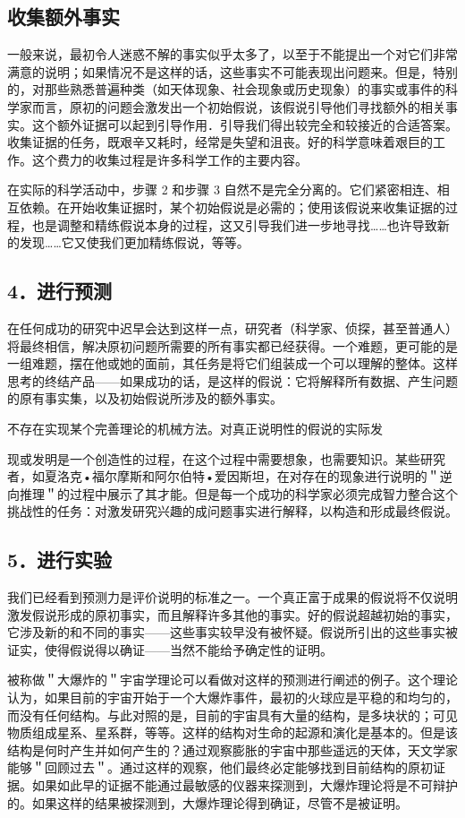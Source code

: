 \subsection{收集额外事实}
一般来说，最初令人迷惑不解的事实似乎太多了，以至于不能提出一个对它们非常满意的说明；如果情况不是这样的话，这些事实不可能表现出问题来。但是，特别的，对那些熟悉普遍种类（如天体现象、社会现象或历史现象）的事实或事件的科学家而言，原初的问题会激发出一个初始假说，该假说引导他们寻找额外的相关事实。这个额外证据可以起到引导作用．引导我们得出较完全和较接近的合适答案。收集证据的任务，既艰辛又耗时，经常是失望和沮丧。好的科学意味着艰巨的工作。这个费力的收集过程是许多科学工作的主要内容。

在实际的科学活动中，步骤 2 和步骤 3 自然不是完全分离的。它们紧密相连、相互依赖。在开始收集证据时，某个初始假说是必需的；使用该假说来收集证据的过程，也是调整和精练假说本身的过程，这又引导我们进一步地寻找……也许导致新的发现……它又使我们更加精练假说，等等。

\subsection{4．进行预测}
在任何成功的研究中迟早会达到这样一点，研究者（科学家、侦探，甚至普通人）将最终相信，解决原初问题所需要的所有事实都已经获得。一个难题，更可能的是一组难题，摆在他或她的面前，其任务是将它们组装成一个可以理解的整体。这样思考的终结产品——如果成功的话，是这样的假说：它将解释所有数据、产生问题的原有事实集，以及初始假说所涉及的额外事实。

不存在实现某个完善理论的机械方法。对真正说明性的假说的实际发

现或发明是一个创造性的过程，在这个过程中需要想象，也需要知识。某些研究者，如夏洛克•福尔摩斯和阿尔伯特•爱因斯坦，在对存在的现象进行说明的＂逆向推理＂的过程中展示了其才能。但是每一个成功的科学家必须完成智力整合这个挑战性的任务：对激发研究兴趣的成问题事实进行解释，以构造和形成最终假说。\cite{peirce1958}

\subsection{5．进行实验}
我们已经看到预测力是评价说明的标准之一。一个真正富于成果的假说将不仅说明激发假说形成的原初事实，而且解释许多其他的事实。好的假说超越初始的事实，它涉及新的和不同的事实——这些事实较早没有被怀疑。假说所引出的这些事实被证实，使得假说得以确证——当然不能给予确定性的证明。

被称做＂大爆炸的＂宇宙学理论可以看做对这样的预测进行阐述的例子。这个理论认为，如果目前的宇宙开始于一个大爆炸事件，最初的火球应是平稳的和均匀的，而没有任何结构。与此对照的是，目前的宇宙具有大量的结构，是多块状的；可见物质组成星系、星系群，等等。这样的结构对生命的起源和演化是基本的。但是该结构是何时产生并如何产生的？通过观察膨胀的宇宙中那些遥远的天体，天文学家能够＂回顾过去＂。通过这样的观察，他们最终必定能够找到目前结构的原初证据。如果如此早的证据不能通过最敏感的仪器来探测到，大爆炸理论将是不可辩护的。如果这样的结果被探测到，大爆炸理论得到确证，尽管不是被证明。

